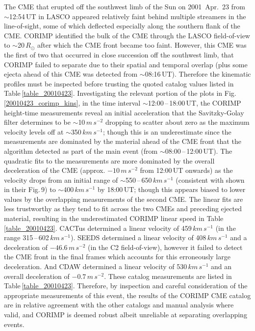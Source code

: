 \documentclass[referee,a4paper,12pt,traditabstract]{swsc}
\begin{document}
\begin{linenumbers}
The CME that erupted off the southwest limb of the Sun on 2001~Apr.~23 from $\sim$12:54\,UT in LASCO appeared relatively faint behind multiple streamers in the line-of-sight, some of which deflected especially along the southern flank of the CME. CORIMP identified the bulk of the CME through the LASCO field-of-view to $\sim$20\,$R_\odot$ after which the CME front became too faint. However, this CME was the first of two that occurred in close succession off the southwest limb, that CORIMP failed to separate due to their spatial and temporal overlap (plus some ejecta ahead of this CME was detected from $\sim$08:16\,UT). Therefore the kinematic profiles must be inspected before trusting the quoted catalog values listed in Table\,\ref{table_20010423}. Investigating the relevant portion of the plots in Fig.\,\ref{20010423_corimp_kins}, in the time interval $\sim$12:00\,--\,18:00\,UT, the CORIMP height-time measurements reveal an initial acceleration that the Savitzky-Golay filter determines to be $\sim$10\,$m\,s^{-2}$ dropping to scatter about zero as the maximum velocity levels off at $\sim$350\,$km\,s^{-1}$; though this is an underestimate since the measurements are dominated by the material ahead of the CME front that the algorithm detected as part of the main event (from $\sim$08:00\,--\,12:00\,UT). The quadratic fits to the measurements are more dominated by the overall deceleration of the CME (approx. $-10\,m\,s^{-2}$ from 12:00\,UT onwards) as the velocity drops from an initial range of $\sim$550\,--\,650\,$km\,s^{-1}$ (consistent with \citealt{2009A&A...495..325B} shown in their Fig.\,9) to $\sim$400\,$km\,s^{-1}$ by 18:00\,UT; though this appears biased to lower values by the overlapping measurements of the second CME. The linear fits are less trustworthy as they tend to fit across the two CMEs and preceding ejected material, resulting in the underestimated CORIMP linear speed in Table\,\ref{table_20010423}. CACTus determined a linear velocity of 459$\,km\,s^{-1}$ (in the range 315\,--\,602\,$km\,s^{-1}$). SEEDS determined a linear velocity of 408$\,km\,s^{-1}$ and a deceleration of $-46.6\,m\,s^{-2}$ (in the C2 field-of-view), however it failed to detect the CME front in the final frames which accounts for this erroneously large deceleration. And CDAW determined a linear velocity of 530$\,km\,s^{-1}$ and an overall deceleration of $-0.7\,m\,s^{-2}$. These catalog measurements are listed in Table\,\ref{table_20010423}. Therefore, by inspection and careful consideration of the appropriate measurements of this event, the results of the CORIMP CME catalog are in relative agreement with the other catalogs and manual analysis where valid, and CORIMP is deemed robust albeit unreliable at separating overlapping events.




\end{linenumbers}
\end{document}
